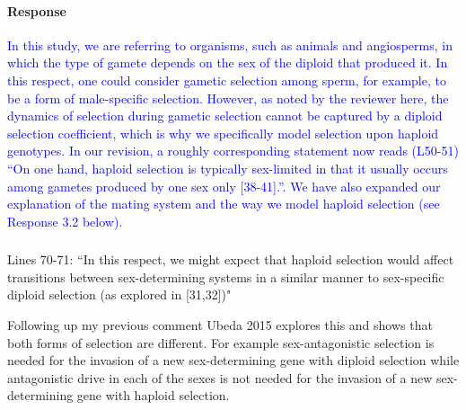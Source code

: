 \documentclass[10pt,letterpaper]{article}
\begin{document}
\noindent\paragraph{Response}
\textcolor{blue}{In this study, we are referring to organisms, such as animals and angiosperms, in which the type of gamete depends on the sex of the diploid that produced it. In this respect, one could consider gametic selection among sperm, for example, to be a form of male-specific selection. 
However, as noted by the reviewer here, the dynamics of selection during gametic selection cannot be captured by a diploid selection coefficient, which is why we specifically model selection upon haploid genotypes.
In our revision, a roughly corresponding statement now reads (L50-51) ``On one hand, haploid selection is typically sex-limited in that it usually occurs among gametes produced by one sex only [38-41].''.
We have also expanded our explanation of the mating system and the way we model haploid selection (see Response 3.2 below).
}

\noindent\subsubsection{}
Lines 70-71: ``In this respect, we might expect that haploid selection would affect transitions between sex-determining systems in a similar manner to sex-specific diploid selection (as explored in [31,32])" 

Following up my previous comment Ubeda 2015 explores this and shows that both forms of selection are different. For example sex-antagonistic selection is needed for the invasion of a new sex-determining gene with diploid selection while antagonistic drive in each of the sexes is not needed for the invasion of a new sex-determining gene with haploid selection.
\end{document}

